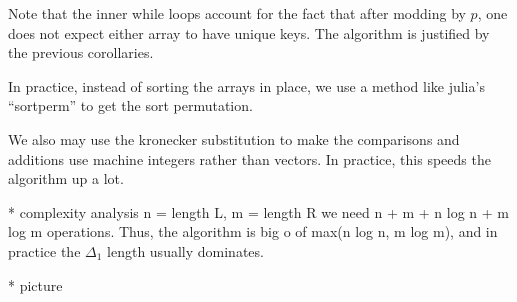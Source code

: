 Note that the inner while loops account for the fact that
after modding by \(p\), one does not expect 
either array to have unique keys.
The algorithm is justified by the previous corollaries.

In practice, instead of sorting the arrays in place, 
we use a method like julia's ``sortperm''
to get the sort permutation.

We also may use the kronecker substitution to make
the comparisons and additions use machine integers
rather than vectors.
In practice, this speeds the algorithm up a lot.

* complexity analysis
n = length L, m = length R
we need n + m + n log n + m log m operations.
Thus, the algorithm is big o of max(n log n, m log m),
and in practice the \(\Delta_{1}\) length
usually dominates.

* picture









